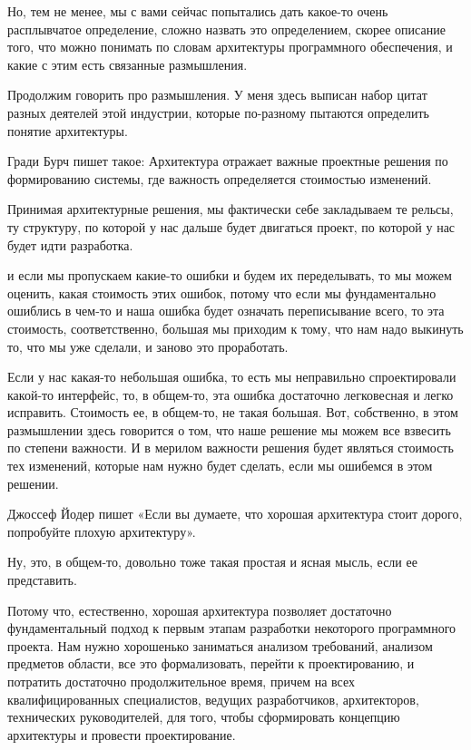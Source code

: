 Но, тем не менее, мы с вами сейчас попытались дать какое-то очень расплывчатое определение, сложно назвать это определением, скорее описание того, что можно понимать по словам архитектуры программного обеспечения, и какие с этим есть связанные размышления. 

Продолжим говорить про размышления. У меня здесь выписан набор цитат разных деятелей этой индустрии, которые по-разному пытаются определить понятие архитектуры.

Гради Бурч пишет такое: Архитектура отражает важные проектные решения по формированию системы, где важность определяется стоимостью изменений.

Принимая архитектурные решения, мы фактически себе закладываем те рельсы, ту структуру, по которой у нас дальше будет двигаться проект, по которой у нас будет идти разработка.

и если мы пропускаем какие-то ошибки и будем их переделывать, то мы можем оценить, какая стоимость этих ошибок, потому что если мы фундаментально ошиблись в чем-то и наша ошибка будет означать переписывание всего, то эта стоимость, соответственно, большая мы приходим к тому, что нам надо выкинуть то, что мы уже сделали, и заново это проработать.

Если у нас какая-то небольшая ошибка, то есть мы неправильно спроектировали какой-то интерфейс, то, в общем-то, эта ошибка достаточно легковесная и легко исправить. Стоимость ее, в общем-то, не такая большая. Вот, собственно, в этом размышлении здесь говорится о том, что наше решение мы можем все взвесить по степени важности. И в мерилом важности решения будет являться стоимость тех изменений, которые нам нужно будет сделать, если мы ошибемся в этом решении. 

Джоссеф Йодер пишет «Если вы думаете, что хорошая архитектура стоит дорого, попробуйте плохую архитектуру». 

Ну, это, в общем-то, довольно тоже такая простая и ясная мысль, если ее представить.

Потому что, естественно, хорошая архитектура позволяет достаточно фундаментальный подход к первым этапам разработки некоторого программного проекта. Нам нужно хорошенько заниматься анализом требований, анализом предметов области, все это формализовать, перейти к проектированию, и потратить достаточно продолжительное время, причем на всех квалифицированных специалистов, ведущих разработчиков, архитекторов, технических руководителей, для того, чтобы сформировать концепцию архитектуры и провести проектирование.

